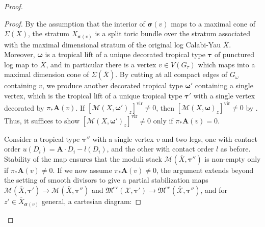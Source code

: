 \documentclass[12pt, oneside]{amsart}   	%
\newcounter{thm}
\newcommand{\vir}{\operatorname{vir}}
\newcommand{\pt}{\operatorname{pt}}
\newcommand{\ev}{\operatorname{ev}}
\numberwithin{equation}{section}
\numberwithin{thm}{section}
\numberwithin{figure}{section}
\begin{document}
\begin{proof}
\begin{proof}
By the assumption that the interior of $\pmb\sigma(v)$ maps to a maximal cone of $\Sigma(X)$, the stratum $X_{\pmb\sigma(v)}$ is a split toric bundle over the stratum associated with the maximal dimensional stratum of the original log Calabi-Yau $\overline{X}$. Moreover, $\pmb\omega$ is a tropical lift of a unique decorated tropical type $\pmb\tau$ of punctured log map to $\overline{X}$, and in particular there is a vertex $v \in V(G_{\tau})$ which maps into a maximal dimension cone of $\Sigma(\overline{X})$. By cutting at all compact edges of $G_{\omega}$ containing $v$, we produce another decorated tropical type $\pmb\omega'$ containing a single vertex, which is the tropical lift of a unique tropical type $\pmb\tau'$ with a single vertex decorated by $\pi_*\textbf{A}(v) $. If $[\mathscr{M}(X,\pmb\omega')_z]^{\vir} \not=0$, then $[\mathscr{M}(X,\pmb\omega)_z]^{\vir}\not=0$ by \cite[Theorem $A.14$]{int_mirror}. Thus, it suffices to show $[\mathscr{M}(X,\pmb\omega')_z]^{\vir} \not=0$ only if $\pi_*\textbf{A}(v) = 0$. 

%
%
%


Consider a tropical type $\pmb\tau''$ with a single vertex $v$ and two legs, one with contact order $u(D_i) = \textbf{A}\cdot D_i - l(D_i)$, and the other with contact order $l$ as before. Stability of the map ensures that the moduli stack $\mathscr{M}(\overline{X},\pmb\tau'')$ is non-empty only if $\pi_*\textbf{A}(v) \not= 0$. If we now assume $\pi_*\textbf{A}(v) \not= 0$, the argument \cite[Lemma $8.5$]{qpint} extends beyond the setting of smooth divisors to give a partial stabilization maps $\mathscr{M}(\overline{X},\pmb\tau') \rightarrow \mathscr{M}(\overline{X},\pmb\tau'')$ and $\mathfrak{M}^{\ev}(\mathcal{X},\pmb\tau') \rightarrow \mathfrak{M}^{\ev}(\overline{\mathcal{X}},\pmb\tau'')$, and for $z' \in \overline{X}_{\pmb\sigma(v)}$ general, a cartesian diagram:


\end{proof}
\end{proof}
\end{document}
